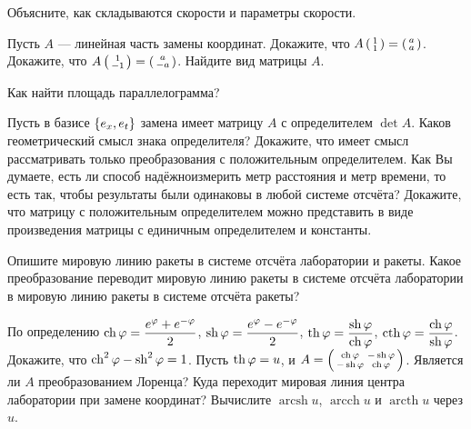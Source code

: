 \documentclass[a4paper,12pt]{article}
\newcommand{\smat}[1]{\hr{\begin{smallmatrix}#1\end{smallmatrix}}}
\newcommand{\мв}{\,м$_в$}
\DeclareMathOperator{\arcsh}{arcsh}
\DeclareMathOperator{\arcch}{arcch}
\DeclareMathOperator{\arcth}{arcth}
\begin{document}
Объясните, как складываются скорости и параметры скорости.

\newpage



Пусть $A$ --- линейная часть замены координат. Докажите, что $A\smat{1\\1} = \smat{a\\a}$.
Докажите, что $A\smat{1\\-1} = \smat{a\\-a}$.
Найдите вид матрицы $A$.

Как найти площадь параллелограмма?

Пусть в базисе $\left\{e_x,e_t\right\}$ замена имеет матрицу $A$ с определителем $\det A$. Каков геометрический смысл знака определителя?
Докажите, что имеет смысл рассматривать только преобразования с положительным определителем.
Как Вы думаете, есть ли способ  надёжно измерить метр расстояния и метр времени, то есть так, чтобы результаты были одинаковы в любой системе отсчёта?
Докажите, что матрицу с положительным определителем можно представить в виде произведения матрицы с единичным определителем и константы.

Опишите мировую линию ракеты в системе отсчёта лаборатории и ракеты.
Какое преобразование переводит мировую линию ракеты в системе отсчёта лаборатории в мировую линию ракеты в системе отсчёта ракеты?




По определению $\ch \ph = \dfrac{e^\ph + e^{-\ph}}{2}$, $\sh \ph = \dfrac{e^\ph - e^{-\ph}}{2}$, $\th\ph = \dfrac{\sh\ph}{\ch\ph}$, $\cth{\ph}=\dfrac{\ch\ph}{\sh\ph}$. Докажите, что $\ch^2\ph - \sh^2\ph = 1$.
Пусть $\th \ph = u$, и $A = \smat{\ch\ph&-\sh\ph\\-\sh\ph&\ch\ph}$. Является ли $A$ преобразованием Лоренца?
Куда переходит мировая линия центра лаборатории при замене координат?
Вычислите $\arcsh u$, $\arcch u$ и $\arcth u$ через $u$.

\vfil\vfil\vfil\vfil\vfil\vfil\vfil\vfil\vfil\vfil\vfil\vfil\vfil\vfil\vfil\vfil\vfil\vfil
\vfil\vfil\vfil\vfil\vfil\vfil\vfil\vfil\vfil\vfil\vfil\vfil\vfil\vfil\vfil\vfil\vfil\vfil\vfil\vfil\vfil\vfil\vfil\vfil\vfil\vfil\vfil\vfil\vfil\vfil\vfil\vfil\vfil\vfil\vfil\vfil
\end{document}
